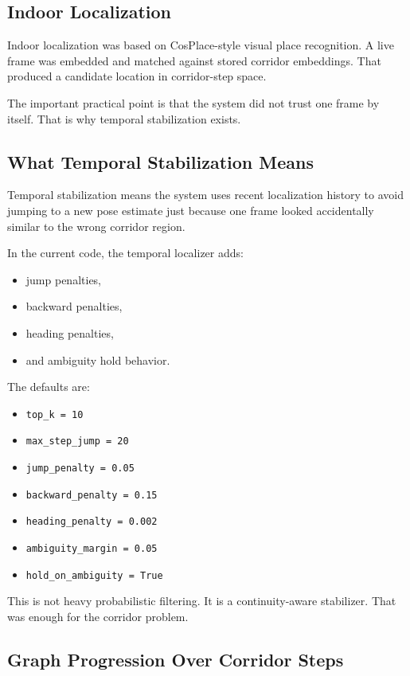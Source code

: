 \documentclass[11pt]{article}
\begin{document}
\subsection{Indoor Localization}

Indoor localization was based on CosPlace-style visual place recognition. A live
frame was embedded and matched against stored corridor embeddings. That produced a
candidate location in corridor-step space.

The important practical point is that the system did not trust one frame by itself.
That is why temporal stabilization exists.

\subsection{What Temporal Stabilization Means}

Temporal stabilization means the system uses recent localization history to avoid
jumping to a new pose estimate just because one frame looked accidentally similar to
the wrong corridor region.

In the current code, the temporal localizer adds:

\begin{itemize}[nosep]
  \item jump penalties,
  \item backward penalties,
  \item heading penalties,
  \item and ambiguity hold behavior.
\end{itemize}

The defaults are:

\begin{itemize}[nosep]
  \item \texttt{top\_k = 10}
  \item \texttt{max\_step\_jump = 20}
  \item \texttt{jump\_penalty = 0.05}
  \item \texttt{backward\_penalty = 0.15}
  \item \texttt{heading\_penalty = 0.002}
  \item \texttt{ambiguity\_margin = 0.05}
  \item \texttt{hold\_on\_ambiguity = True}
\end{itemize}

This is not heavy probabilistic filtering. It is a continuity-aware stabilizer. That
was enough for the corridor problem.

\subsection{Graph Progression Over Corridor Steps}
\end{document}
